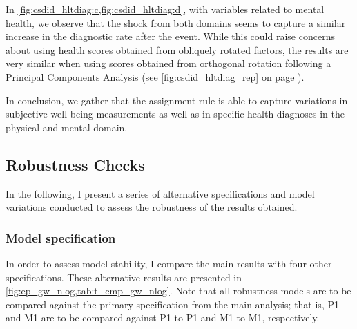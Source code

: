 In \cref{fig:csdid_hltdiag:c,fig:csdid_hltdiag:d}, with variables related to mental health, we observe that the shock from both domains seems to capture a similar increase in the diagnostic rate after the event.
While this could raise concerns about using health scores obtained from obliquely rotated factors, the results are very similar when using scores obtained from orthogonal rotation following a Principal Components Analysis (see
\cref{fig:csdid_hltdiag_rep} on page \pageref{fig:csdid_hltdiag_rep}).

In conclusion, we gather that the assignment rule is able to capture variations in subjective well-being measurements as well as in specific health diagnoses in the physical and mental domain.




\subsection{Robustness Checks}
\label{sec:robusts_specific}

In the following, I present a series of alternative specifications and model variations conducted to assess the robustness of the results obtained.

\subsubsection{Model specification} In order to assess model stability, I compare the main results with four other specifications. These alternative results are presented in \cref{fig:ep_gw_nlog,tab:t_cmp_gw_nlog}. 
Note that all robustness models are to be compared against the primary specification from the main analysis; that
is, P1 and M1 are to be compared against P1 to P1 and M1 to M1, respectively.

